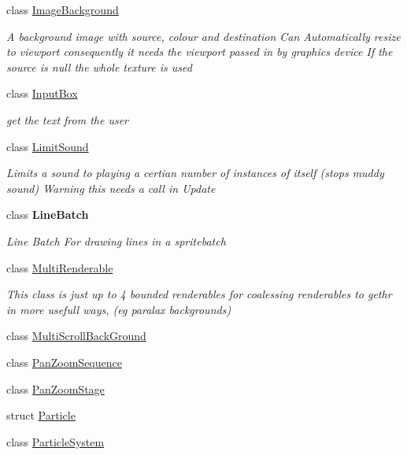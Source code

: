 \begin{DoxyCompactItemize}
class \mbox{\hyperlink{class_r_c___framework_1_1_image_background}{Image\+Background}}
\begin{DoxyCompactList}\small\item\em A background image with source, colour and destination Can Automatically resize to viewport consequently it needs the viewport passed in by graphics device If the source is null the whole texture is used \end{DoxyCompactList}\item 
class \mbox{\hyperlink{class_r_c___framework_1_1_input_box}{Input\+Box}}
\begin{DoxyCompactList}\small\item\em get the text from the user \end{DoxyCompactList}\item 
class \mbox{\hyperlink{class_r_c___framework_1_1_limit_sound}{Limit\+Sound}}
\begin{DoxyCompactList}\small\item\em Limits a sound to playing a certian number of instances of itself (stops muddy sound) Warning this needs a call in Update \end{DoxyCompactList}\item 
class {\bfseries Line\+Batch}
\begin{DoxyCompactList}\small\item\em Line Batch For drawing lines in a spritebatch \end{DoxyCompactList}\item 
class \mbox{\hyperlink{class_r_c___framework_1_1_multi_renderable}{Multi\+Renderable}}
\begin{DoxyCompactList}\small\item\em This class is just up to 4 bounded renderables for coalessing renderables to gethr in more usefull ways, (eg paralax backgrounds) \end{DoxyCompactList}\item 
class \mbox{\hyperlink{class_r_c___framework_1_1_multi_scroll_back_ground}{Multi\+Scroll\+Back\+Ground}}
\item 
class \mbox{\hyperlink{class_r_c___framework_1_1_pan_zoom_sequence}{Pan\+Zoom\+Sequence}}
\item 
class \mbox{\hyperlink{class_r_c___framework_1_1_pan_zoom_stage}{Pan\+Zoom\+Stage}}
\item 
struct \mbox{\hyperlink{struct_r_c___framework_1_1_particle}{Particle}}
\item 
class \mbox{\hyperlink{class_r_c___framework_1_1_particle_system}{Particle\+System}}

\end{DoxyCompactItemize}
